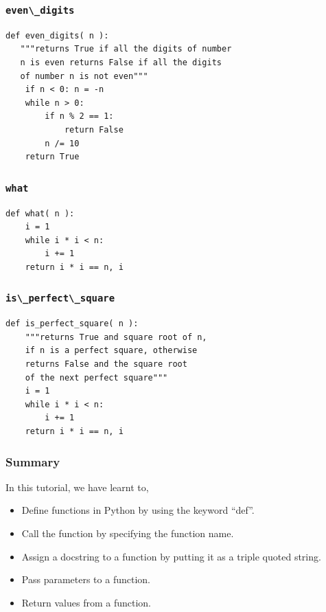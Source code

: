 \documentclass[presentation]{beamer}
\begin{document}
\begin{frame}[fragile]
\frametitle{\verb~even\_digits~}
\label{sec-13}

\lstset{language=Python}
\begin{lstlisting}
def even_digits( n ):
   """returns True if all the digits of number 
   n is even returns False if all the digits 
   of number n is not even"""
    if n < 0: n = -n
    while n > 0:
        if n % 2 == 1:
            return False
        n /= 10
    return True
\end{lstlisting}
\end{frame}
\begin{frame}[fragile]
\frametitle{\verb~what~}
\label{sec-14}

\lstset{language=Python}
\begin{lstlisting}
def what( n ):
    i = 1
    while i * i < n:
        i += 1
    return i * i == n, i
\end{lstlisting}
\end{frame}
\begin{frame}[fragile]
\frametitle{\verb~is\_perfect\_square~}
\label{sec-15}

\lstset{language=Python}
\begin{lstlisting}
def is_perfect_square( n ):
    """returns True and square root of n, 
    if n is a perfect square, otherwise 
    returns False and the square root 
    of the next perfect square"""
    i = 1
    while i * i < n:
        i += 1
    return i * i == n, i
\end{lstlisting}
\end{frame}
\begin{frame}
\frametitle{Summary}
\label{sec-16}

 In this tutorial, we have learnt to,


\begin{itemize}
\item Define functions in Python by using the keyword ``def''.
\item Call the function by specifying the function name.
\item Assign a docstring to a function by putting it as a triple quoted string.
\item Pass parameters to a function.
\item Return values from a function.
\end{itemize}
\end{frame}
\end{document}

